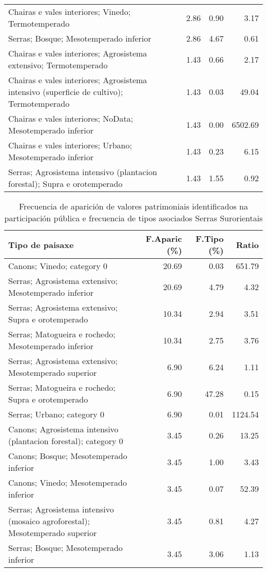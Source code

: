 \begin{table}[p]
\begin{tabular}{lrrr}
  Chairas e vales interiores; Vinedo; Termotemperado & 2.86 & 0.90 & 3.17 \\ 
  Serras; Bosque; Mesotemperado inferior & 2.86 & 4.67 & 0.61 \\ 
  Chairas e vales interiores; Agrosistema extensivo; Termotemperado & 1.43 & 0.66 & 2.17 \\ 
  Chairas e vales interiores; Agrosistema intensivo (superficie de cultivo); Termotemperado & 1.43 & 0.03 & 49.04 \\ 
  Chairas e vales interiores; NoData; Mesotemperado inferior & 1.43 & 0.00 & 6502.69 \\ 
  Chairas e vales interiores; Urbano; Mesotemperado inferior & 1.43 & 0.23 & 6.15 \\ 
  Serras; Agrosistema intensivo (plantacion forestal); Supra e orotemperado & 1.43 & 1.55 & 0.92 \\ 
   \hline
\end{tabular}
\end{table}
\begin{table}[p]
\centering
\caption{Frecuencia de aparición de valores patrimoniais identificados na participación pública e frecuencia de tipos asociados Serras Surorientais} 
\label{vsixotpat9}
\begin{tabular}{lrrr}
  \hline
Tipo de paisaxe & F.Aparic (\%) & F.Tipo (\%) & Ratio \\ 
  \hline
Canons; Vinedo; category 0 & 20.69 & 0.03 & 651.79 \\ 
  Serras; Agrosistema extensivo; Mesotemperado inferior & 20.69 & 4.79 & 4.32 \\ 
  Serras; Agrosistema extensivo; Supra e orotemperado & 10.34 & 2.94 & 3.51 \\ 
  Serras; Matogueira e rochedo; Mesotemperado inferior & 10.34 & 2.75 & 3.76 \\ 
  Serras; Agrosistema extensivo; Mesotemperado superior & 6.90 & 6.24 & 1.11 \\ 
  Serras; Matogueira e rochedo; Supra e orotemperado & 6.90 & 47.28 & 0.15 \\ 
  Serras; Urbano; category 0 & 6.90 & 0.01 & 1124.54 \\ 
  Canons; Agrosistema intensivo (plantacion forestal); category 0 & 3.45 & 0.26 & 13.25 \\ 
  Canons; Bosque; Mesotemperado inferior & 3.45 & 1.00 & 3.43 \\ 
  Canons; Vinedo; Mesotemperado inferior & 3.45 & 0.07 & 52.39 \\ 
  Serras; Agrosistema intensivo (mosaico agroforestal); Mesotemperado superior & 3.45 & 0.81 & 4.27 \\ 
  Serras; Bosque; Mesotemperado inferior & 3.45 & 3.06 & 1.13 \\ 
   \hline
\end{tabular}
\end{table}
